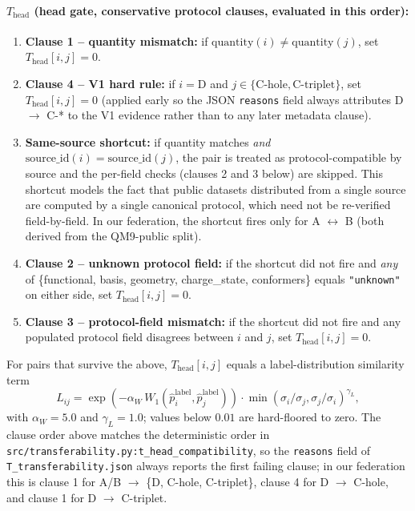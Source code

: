 \documentclass[11pt,a4paper]{article}
\begin{document}
\paragraph{$T_{\mathrm{head}}$ (head gate, conservative protocol clauses, evaluated in this order):}
\begin{enumerate}
  \item \textbf{Clause 1 -- quantity mismatch:} if $\mathrm{quantity}(i) \ne \mathrm{quantity}(j)$, set $T_{\mathrm{head}}[i, j] = 0$.
  \item \textbf{Clause 4 -- V1 hard rule:} if $i = \mathrm{D}$ and $j \in \{\mathrm{C\text{-}hole}, \mathrm{C\text{-}triplet}\}$, set $T_{\mathrm{head}}[i, j] = 0$ (applied early so the JSON \texttt{reasons} field always attributes D $\to$ C-* to the V1 evidence rather than to any later metadata clause).
  \item \textbf{Same-source shortcut:} if quantity matches \emph{and} $\mathrm{source\_id}(i) = \mathrm{source\_id}(j)$, the pair is treated as protocol-compatible by source and the per-field checks (clauses 2 and 3 below) are skipped. This shortcut models the fact that public datasets distributed from a single source are computed by a single canonical protocol, which need not be re-verified field-by-field. In our federation, the shortcut fires only for A $\leftrightarrow$ B (both derived from the QM9-public split).
  \item \textbf{Clause 2 -- unknown protocol field:} if the shortcut did not fire and \emph{any} of \{functional, basis, geometry, charge\_state, conformers\} equals \texttt{"unknown"} on either side, set $T_{\mathrm{head}}[i, j] = 0$.
  \item \textbf{Clause 3 -- protocol-field mismatch:} if the shortcut did not fire and any populated protocol field disagrees between $i$ and $j$, set $T_{\mathrm{head}}[i, j] = 0$.
\end{enumerate}
For pairs that survive the above, $T_{\mathrm{head}}[i, j]$ equals a label-distribution similarity term
\[
L_{ij} = \exp(-\alpha_W\, W_1(\hat p_i^{\mathrm{label}}, \hat p_j^{\mathrm{label}})) \cdot \min(\sigma_i/\sigma_j, \sigma_j/\sigma_i)^{\gamma_L},
\]
with $\alpha_W = 5.0$ and $\gamma_L = 1.0$; values below $0.01$ are hard-floored to zero. The clause order above matches the deterministic order in \texttt{src/transferability.py:t\_head\_compatibility}, so the \texttt{reasons} field of \texttt{T\_transferability.json} always reports the first failing clause; in our federation this is clause 1 for A/B $\to$ \{D, C-hole, C-triplet\}, clause 4 for D $\to$ C-hole, and clause 1 for D $\to$ C-triplet.
\end{document}
